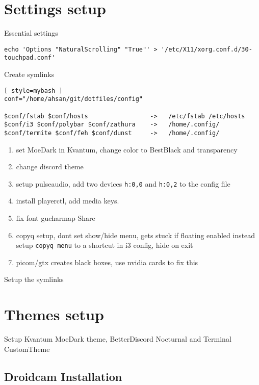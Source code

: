 \documentclass[11pt, article, a4paper]{memoir}
\begin{document}
\section*{Settings setup}

Essential settings

\begin{lstlisting}[style=mybash]
echo 'Options "NaturalScrolling" "True"' > '/etc/X11/xorg.conf.d/30-touchpad.conf'
\end{lstlisting}

Create symlinks

\begin{lstlisting}[ style=mybash ]
conf="/home/ahsan/git/dotfiles/config"

$conf/fstab $conf/hosts                 ->   /etc/fstab /etc/hosts
$conf/i3 $conf/polybar $conf/zathura    ->   /home/.config/
$conf/termite $conf/feh $conf/dunst     ->   /home/.config/
\end{lstlisting}


\begin{enumerate}
    \item set MoeDark in Kvantum, change color to BestBlack and transparency
    \item change discord theme
    \item setup pulseaudio, add two devices \texttt{h:0,0} and \texttt{h:0,2} to
        the config file
    \item install playerctl, add media keys.
    \item fix font gucharmap Share
    \item copyq setup, dont set show/hide menu, gets stuck if floating enabled
        instead setup \texttt{copyq menu} to a shortcut in i3 config, hide on exit
    \item picom/gtx creates black boxes, use nvidia cards to fix this
\end{enumerate}

Setup the symlinks %


\section*{Themes setup}
Setup Kvantum MoeDark theme, BetterDiscord Nocturnal and Terminal CustomTheme


\subsection{Droidcam Installation}
\end{document}

